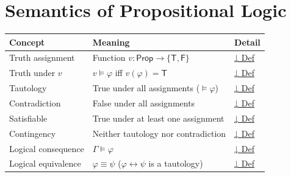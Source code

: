 
\section{Semantics of Propositional Logic}

\begin{tcolorbox}[colback=gray!6, colframe=gray!40, arc=2pt,
  left=6pt, right=6pt, top=4pt, bottom=4pt,
  title={\small\textbf{Semantics Toolkit — Quick Reference}},
  fonttitle=\small\bfseries]
\small
\begin{tabular}{l l l}
\toprule
\textbf{Concept} & \textbf{Meaning} & \textbf{Detail} \\
\midrule
Truth assignment   & Function $v: \mathsf{Prop} \to \{\mathsf{T},\mathsf{F}\}$ & \hyperref[def:truth-assign]{↓ Def} \\
Truth under $v$    & $v \models \varphi$ iff $v(\varphi) = \mathsf{T}$ & \hyperref[def:satisfaction]{↓ Def} \\
Tautology          & True under all assignments ($\models\varphi$) & \hyperref[def:tautology]{↓ Def} \\
Contradiction      & False under all assignments & \hyperref[def:contradiction]{↓ Def} \\
Satisfiable        & True under at least one assignment & \hyperref[def:satisfiable]{↓ Def} \\
Contingency        & Neither tautology nor contradiction & \hyperref[def:contingency]{↓ Def} \\
Logical consequence & $\Gamma \models \varphi$ & \hyperref[def:consequence]{↓ Def} \\
Logical equivalence & $\varphi \equiv \psi$ ($\varphi \leftrightarrow \psi$ is a tautology) & \hyperref[def:log-equiv]{↓ Def} \\
\bottomrule
\end{tabular}
\end{tcolorbox}

\vspace{1em}

